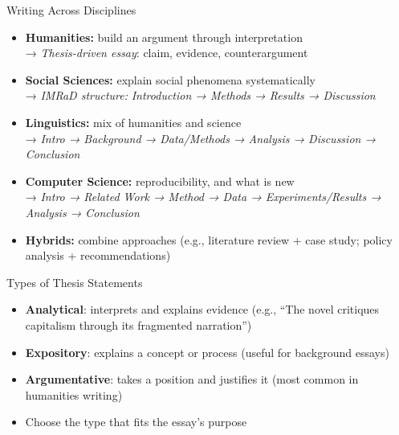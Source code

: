 \documentclass[aspectratio=169]{beamer}
\begin{document}
\begin{frame}{Writing Across Disciplines}
\begin{itemize}
  \item \textbf{Humanities:} build an argument through interpretation
    \\ → \textit{Thesis-driven essay}: claim, evidence, counterargument
  \item \textbf{Social Sciences:} explain social phenomena systematically
    \\ → \textit{IMRaD structure:} \textit{Introduction →  Methods →  Results →  Discussion}
  \item \textbf{Linguistics:} mix of humanities and science
    \\ → \textit{Intro → Background → Data/Methods → Analysis → Discussion → Conclusion}
  \item \textbf{Computer Science:} reproducibility, and what is new
    \\ → \textit{Intro → Related Work → Method → Data → Experiments/Results → Analysis → Conclusion}
  \item \textbf{Hybrids:} combine approaches (e.g., literature review + case study; policy analysis + recommendations)
\end{itemize}
\end{frame}

\begin{frame}{Types of Thesis Statements}
\begin{itemize}
  \item \textbf{Analytical}: interprets and explains evidence
        (e.g., “The novel critiques capitalism through its fragmented narration”)
  \item \textbf{Expository}: explains a concept or process
        (useful for background essays)
  \item \textbf{Argumentative}: takes a position and justifies it
        (most common in humanities writing)
  \item Choose the type that fits the essay's purpose
\end{itemize}
\end{frame}
\end{document}
